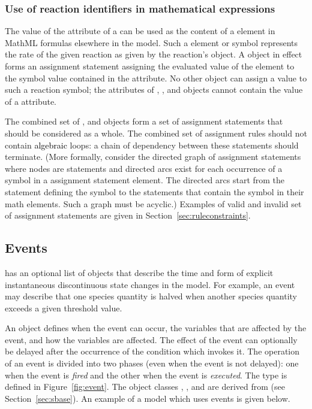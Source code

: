 \subsubsection{Use of reaction identifiers in mathematical expressions}
\label{subsec:reaction-as-symbol}

The value of the  attribute of a \Reaction can be
used as the content of a  element in MathML formulas
elsewhere in the model. Such a  element or symbol
represents the rate of the given reaction as given by the
reaction's \KineticLaw object. 
A \KineticLaw object in effect forms an assignment statement
assigning the evaluated value of the  element to the
symbol value contained in the \Reaction {} attribute.  No
other object can assign a value to such a reaction symbol; \ie
the  attributes of \InitialAssignment, \RateRule,
\AssignmentRule and \EventAssignment objects cannot contain the
value of a \Reaction {} attribute.

The combined set of \InitialAssignment, \AssignmentRule and
\KineticLaw objects form a set of assignment statements that
should be considered as a whole.  The combined set of assignment
rules should not contain \textcolor{black}{algebraic} loops: a chain of dependency
between these statements should terminate.  (More formally,
consider the directed graph of assignment statements where nodes
are statements and directed arcs exist for each occurrence of a
symbol in a assignment statement  element. The directed
arcs start from the statement defining the symbol to the
statements that contain the symbol in their math elements. Such a
graph must be acyclic.)  Examples of valid and invalid set of
assignment statements are given in
Section~\ref{sec:ruleconstraints}.


\subsection{Events}
\label{sec:events}

\Model has an optional list of \Event objects that describe the
time and form of explicit instantaneous discontinuous state
changes in the model.  For example, an event may describe that one
species quantity is halved when another species quantity exceeds a
given threshold value.

An \Event object defines when the event can occur, the
variables that are affected by the event, and how the variables
are affected.  The effect of the event can optionally be delayed
after the occurrence of the condition which invokes it.  The
operation of an event is divided into two phases (even
when the event is not delayed): one when the event is \emph{fired}
and the other when the event is \emph{executed}. The \Event type
is defined in Figure~\vref{fig:event}.  The
  object classes
  \Event, \Trigger, \Delay and \EventAssignment are derived from
  \SBase{} (see Section~\ref{sec:sbase}).  An example
of a model which uses events is given below.

